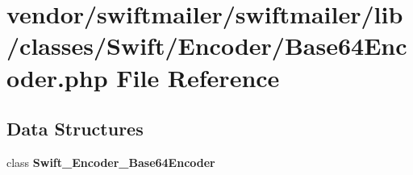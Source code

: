 \section{vendor/swiftmailer/swiftmailer/lib/classes/\+Swift/\+Encoder/\+Base64\+Encoder.php File Reference}
\label{_base64_encoder_8php}
\subsection*{Data Structures}
\begin{DoxyCompactItemize}
\item 
class {\bf Swift\+\_\+\+Encoder\+\_\+\+Base64\+Encoder}
\end{DoxyCompactItemize}
